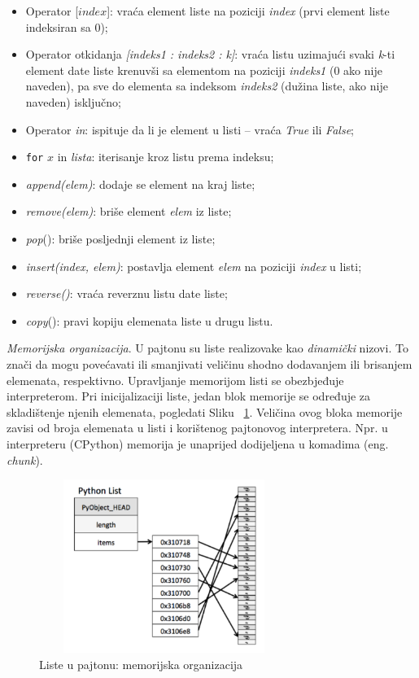 \begin{itemize}
	\item Operator [$index$]: vraća element liste na poziciji \textit{index} (prvi element liste indeksiran sa 0); 
	\item Operator otkidanja \textit{[indeks1 : indeks2 : k]}: vraća listu uzimajući svaki \textit{k}-ti  element date liste  krenuvši sa elementom na poziciji \textit{indeks1} (0 ako nije naveden),  pa sve do elementa sa indeksom \textit{indeks2} (dužina liste, ako nije naveden) isključno; 
	\item Operator \textit{in}: ispituje da li je element u listi -- vraća \emph{True} ili \emph{False};
	\item \texttt{for} $x$ in \emph{lista}: iterisanje kroz listu prema indeksu; 
	\item \textit{append(elem)}: dodaje se element na kraj liste;
	\item  \textit{remove(elem)}: briše element \textit{elem} iz liste;
	\item  \textit{pop}(): briše posljednji element iz liste;
	\item  \textit{insert(index, elem)}: postavlja element \textit{elem} na poziciji \textit{index} u listi;
	\item  \textit{reverse()}: vraća reverznu  listu date liste; 
	\item \textit{copy}(): pravi kopiju elemenata liste u drugu listu. 
 \end{itemize}

\textit{Memorijska organizacija}.  U pajtonu su liste realizovake kao \textit{dinamički} nizovi. To znači da mogu povećavati ili smanjivati veličinu shodno dodavanjem ili brisanjem elemenata, respektivno. Upravljanje memorijom listi se obezbjeđuje interpreterom.  Pri inicijalizaciji liste, jedan blok memorije se određuje za skladištenje njenih elemenata, pogledati Sliku~	\ref{fig: mem_list_org}.  Veličina ovog bloka memorije zavisi od broja elemenata u listi i korištenog pajtonovog  interpretera.  Npr. u interpreteru (CPython)  memorija je unaprijed dodijeljena u komadima (eng. \textit{chunk}).

 \begin{figure}[!ht]
	\centering
	\includegraphics[width=230pt,height=160pt]{slike/list_mem_org.png}

	\caption{Liste u pajtonu: memorijska organizacija} 	\label{fig: mem_list_org}
\end{figure}


